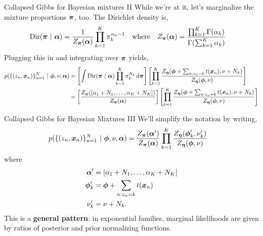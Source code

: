 \documentclass[aspectratio=169]{beamer}
\begin{document}
\begin{frame}{Collapsed Gibbs for Bayesian mixtures II}
    While we're at it, let's marginalize the mixture proportions $\boldsymbol{\pi}$, too. The Dirichlet density is,
    \begin{align}
        \mathrm{Dir}(\boldsymbol{\pi} ~\vert~ \boldsymbol{\alpha}) 
        &= \frac{1}{Z_{\boldsymbol{\pi}}(\boldsymbol{\alpha})} \prod_{k=1}^K \pi_k^{\alpha_k - 1} 
        \quad \text{where} \quad
        Z_{\boldsymbol{\pi}}(\boldsymbol{\alpha}) = \frac{\prod_{k=1}^K \Gamma(\alpha_k)}{\Gamma(\sum_{k=1}^K \alpha_k)}
    \end{align}
    Plugging this in and integrating over $\boldsymbol{\pi}$ yields,
    \begin{align}
        p(\{(z_n, \boldsymbol{x}_n)\}_{n=1}^N ~\vert~ \boldsymbol{\phi}, \nu, \boldsymbol{\alpha}) 
        &=
        \left[ \int \mathrm{Dir}(\boldsymbol{\pi} ~\vert~ \boldsymbol{\alpha}) \prod_{k=1}^K \pi_k^{N_k} \mathop{}\!\mathrm{d} \boldsymbol{\pi} \right] 
        \left[ \prod_{k=1}^K \frac{Z_{\boldsymbol{\eta}}(\boldsymbol{\phi} + \sum_{n: z_n=k} t(\boldsymbol{x}_n), \nu + N_k)}{Z_{\boldsymbol{\eta}}(\boldsymbol{\phi}, \nu)} \right] \\
        &=
        \left[ \frac{Z_{\boldsymbol{\pi}}([\alpha_1 + N_1, \ldots, \alpha_K + N_K])}{Z_{\boldsymbol{\pi}}(\boldsymbol{\alpha})} \right] 
        \left[ \prod_{k=1}^K \frac{Z_{\boldsymbol{\eta}}(\boldsymbol{\phi} + \sum_{n: z_n=k} t(\boldsymbol{x}_n), \nu + N_k)}{Z_{\boldsymbol{\eta}}(\boldsymbol{\phi}, \nu)} \right] 
    \end{align}
\end{frame}

\begin{frame}{Collapsed Gibbs for Bayesian Mixtures III}
We'll simplify the notation by writing,
\begin{align}
    p(\{(z_n, \boldsymbol{x}_n)\}_{n=1}^N ~\vert~ \boldsymbol{\phi}, \nu, \boldsymbol{\alpha}) 
    &=
    \frac{Z_{\boldsymbol{\pi}}(\boldsymbol{\alpha}')}{Z_{\boldsymbol{\pi}}(\boldsymbol{\alpha})}
    \prod_{k=1}^K \frac{Z_{\boldsymbol{\eta}}(\boldsymbol{\phi}_k', \nu_k')}{Z_{\boldsymbol{\eta}}(\boldsymbol{\phi}, \nu)}
\end{align}
where 
\begin{align}
    \boldsymbol{\alpha}' &= [\alpha_1 + N_1, \ldots, \alpha_K + N_K] \\
    \boldsymbol{\phi}_k' &= \boldsymbol{\phi} + \sum_{n: z_n=k} t(\boldsymbol{x}_n)\\
    \nu_k' &= \nu + N_k.
\end{align}
This is a \textbf{general pattern}: in exponential families, marginal likelihoods are given by ratios of posterior and prior normalizing functions.
\end{frame}
\end{document}
